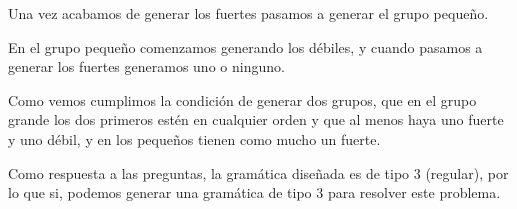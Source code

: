 \documentclass[12pt, spanish]{article}
\begin{document}
Una vez acabamos de generar los fuertes pasamos a generar el grupo pequeño.

En el grupo pequeño comenzamos generando los débiles, y cuando pasamos a generar los fuertes generamos uno o ninguno.

Como vemos cumplimos la condición de generar dos grupos, que en el grupo grande los dos primeros estén en cualquier orden y que al menos haya uno fuerte y uno débil, y en los pequeños tienen como mucho un fuerte. 

Como respuesta a las preguntas, la gramática diseñada es de tipo 3 (regular), por lo que si, podemos generar una gramática de tipo 3 para resolver este problema.
\end{document}
